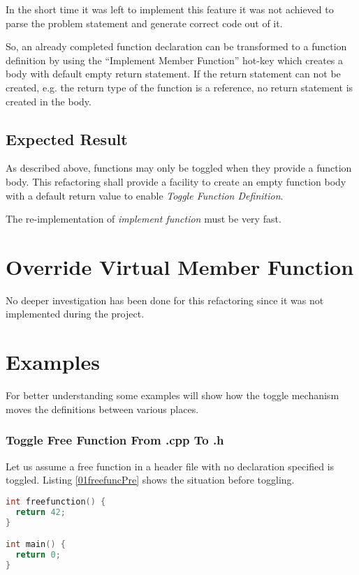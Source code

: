 In the short time it was left to implement this feature it was not achieved to
parse the problem statement and generate correct code out of it.\newline 

So, an already completed function declaration can be transformed to a function
definition by using the ``Implement Member Function'' hot-key which creates a
body with default empty return statement. If the return statement can not be
created, e.g. the return type of the function is a reference, no return
statement is created in the body.

\subsection{Expected Result}
As described above, functions may only be toggled when they provide a function 
body. This refactoring shall provide a facility to create an empty function body 
with a default return value to enable \textit{Toggle Function Definition}.

The re-implementation of \textit{implement function} must be very fast. 

\section{Override Virtual Member Function}

No deeper investigation has been done for this refactoring since it was not 
implemented during the project.

\section{Examples}

For better understanding some examples will show how the toggle mechanism moves
the definitions between various places.

\subsubsection{Toggle Free Function From .cpp To .h}
Let us assume a free function in a header file with no declaration specified is
toggled. Listing \nolinebreak\ref{01freefuncPre} shows the situation before
toggling. 

\begin{lstlisting}[caption={A.cpp},label={01freefuncPre},language=C++]
int freefunction() {
  return 42;
}

int main() {
  return 0;
}
\end{lstlisting}


